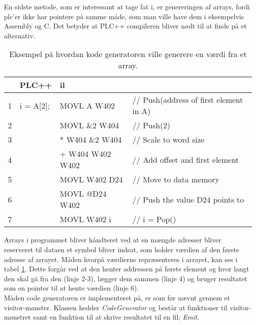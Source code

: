 {

\noindent En sidste metode, som er interessant at tage fat i, er genereringen af arrays, fordi \gls{plc}'er ikke har pointere på samme måde, som man ville have dem i eksempelvis Assembly og C. Det betyder at PLC++ compileren bliver nødt til at finde på et alternativ.

\begin{table}[H]
    \centering\ttfamily
    \begin{tabular}{l|l|l l}
         &PLC++       & \gls{il} \\\hline
        1&i = A[2];   & MOVL A W402       &// Push(address of first element in A)\\
        2&            & MOVL \&2 W404     &// Push(2)\\
        3&            & * W404 \&2 W404   &// Scale to word size\\
        4&            & + W404 W402 W402  &// Add offset and first element\\
        5&            & MOVL W402 D24     &// Move to data memory\\
        6&            & MOVL @D24 W402    &// Push the value D24 points to\\
        7&            & MOVL W402 i       &// i = Pop()
    \end{tabular}
    \caption{Eksempel på hvordan kode generatoren ville generere en værdi fra et array.}
    \label{tab:codegenArray}
\end{table}

\noindent Arrays i programmet bliver håndteret ved at en mængde adresser bliver reserveret til dataen et symbol bliver indsat, som holder værdien af den første adresse af arrayet. Måden hvorpå værdierne repræsenteres i arrayet, kan ses i tabel \ref{tab:codegenArray}. Dette forgår ved at den henter addressen på første element og hvor langt den skal gå fra den (linje 2-3), lægger dem sammen (linje 4) og bruger resultatet som en pointer til at hente værdien (linje 6).\\

Måden code generatoren er implementeret på, er som før nævnt gennem et visitor-mønster. Klassen hedder \textit{CodeGenerator} og består at funktioner til visitor-mønstret samt en funktion til at skrive resultatet til en fil; \textit{Emit}.

}

